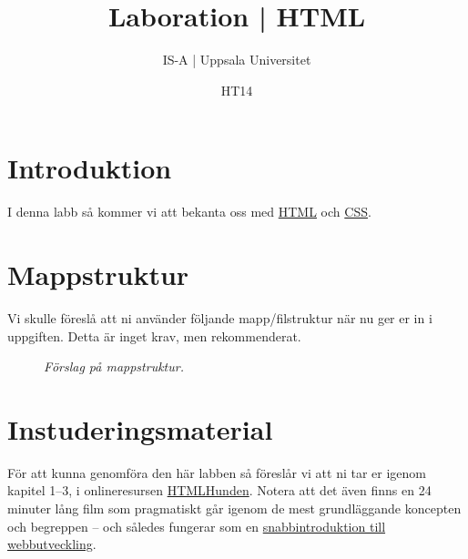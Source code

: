 \documentclass{article}
\begin{document}
  \title{ Laboration | HTML }
  \author{ IS-A | Uppsala Universitet }
  \date{ HT14 }
  \maketitle

  \lstset{language=XML}







\section*{Introduktion}
I denna labb så kommer vi att bekanta oss med \href{http://en.wikipedia.org/wiki/HTML}{HTML} och \href{http://en.wikipedia.org/wiki/Cascading_Style_Sheets}{CSS}.


\section{Mappstruktur}
Vi skulle föreslå att ni använder följande mapp/filstruktur när nu ger er in i uppgiften. Detta är inget krav, men rekommenderat.



\begin{figure}[h]
  \centering
  

  \caption{\emph{Förslag på mappstruktur.}}
\end{figure}





\section{Instuderingsmaterial}
För att kunna genomföra den här labben så föreslår vi att ni tar er igenom kapitel 1--3, i onlineresursen \href{http://htmlhunden.se/dist/toc.html}{HTMLHunden}. Notera att det även finns en 24 minuter lång film som pragmatiskt går igenom de mest grundläggande koncepten och begreppen -- och således fungerar som en \href{http://htmlhunden.se/dist/02-00-html-intro.html}{snabbintroduktion till webbutveckling}.
\end{document}
